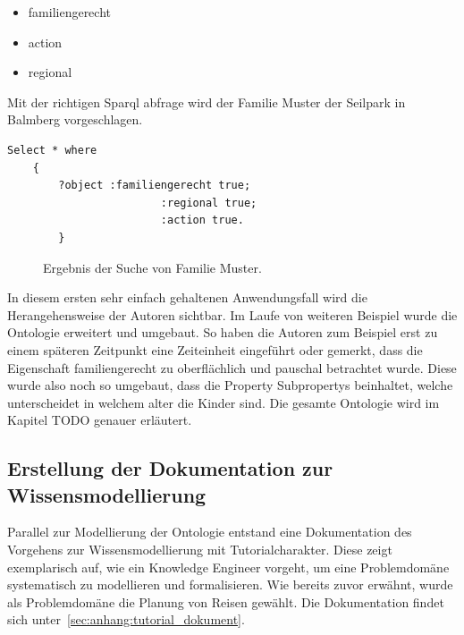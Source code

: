 \begin{itemize}
		\item familiengerecht
		\item action
		\item regional
\end{itemize}

Mit der richtigen Sparql abfrage wird der Familie Muster der Seilpark in Balmberg vorgeschlagen.

\begin{lstlisting}
Select * where
	{
		?object :familiengerecht true;
						:regional true;
						:action true.
		}
\end{lstlisting}	


\begin{figure}[H]
\centering {}
\caption{Ergebnis der Suche von Familie Muster.\label{fig:famMusterOutput}\protect\footnotemark}
\end{figure}

In diesem ersten sehr einfach gehaltenen Anwendungsfall wird die Herangehensweise der Autoren sichtbar. Im Laufe von weiteren Beispiel wurde die Ontologie erweitert und umgebaut. So haben die Autoren zum Beispiel erst zu einem späteren Zeitpunkt eine Zeiteinheit eingeführt oder gemerkt, dass die Eigenschaft familiengerecht zu oberflächlich und pauschal betrachtet wurde. Diese wurde also noch so umgebaut, dass die Property Subpropertys beinhaltet, welche unterscheidet in welchem alter die Kinder sind. Die gesamte Ontologie wird im Kapitel TODO genauer erläutert.


\subsection{Erstellung der Dokumentation zur Wissensmodellierung }
\label{subsec:dokumentation_wissensmodellierung}
Parallel zur Modellierung der Ontologie entstand eine Dokumentation des Vorgehens zur Wissensmodellierung mit Tutorialcharakter. Diese zeigt exemplarisch auf, wie ein Knowledge Engineer vorgeht, um eine Problemdomäne systematisch zu modellieren und formalisieren. Wie bereits zuvor erwähnt, wurde als Problemdomäne die Planung von Reisen gewählt. Die Dokumentation findet sich unter~\autoref{sec:anhang:tutorial_dokument}.

